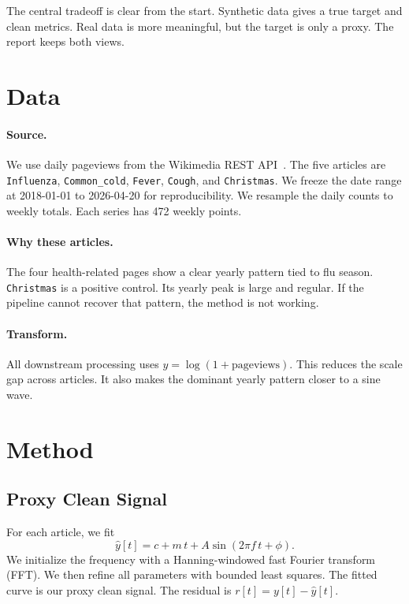 \documentclass{article}
\begin{document}
The central tradeoff is clear from the start. Synthetic data gives a true target and clean metrics. Real data is more meaningful, but the target is only a proxy. The report keeps both views.

\section{Data}

\paragraph{Source.}
We use daily pageviews from the Wikimedia REST API~\citep{wikimedia}. The five articles are \texttt{Influenza}, \texttt{Common\_cold}, \texttt{Fever}, \texttt{Cough}, and \texttt{Christmas}. We freeze the date range at 2018-01-01 to 2026-04-20 for reproducibility. We resample the daily counts to weekly totals. Each series has 472 weekly points.

\paragraph{Why these articles.}
The four health-related pages show a clear yearly pattern tied to flu season. \texttt{Christmas} is a positive control. Its yearly peak is large and regular. If the pipeline cannot recover that pattern, the method is not working.

\paragraph{Transform.}
All downstream processing uses $y = \log(1 + \mathrm{pageviews})$. This reduces the scale gap across articles. It also makes the dominant yearly pattern closer to a sine wave.

\section{Method}

\subsection{Proxy Clean Signal}

For each article, we fit
\begin{equation}
\hat{y}[t] = c + m\,t + A \sin(2 \pi f\,t + \phi).
\end{equation}
We initialize the frequency with a Hanning-windowed fast Fourier transform (FFT). We then refine all parameters with bounded least squares. The fitted curve is our proxy clean signal. The residual is $r[t] = y[t] - \hat{y}[t]$.
\end{document}
